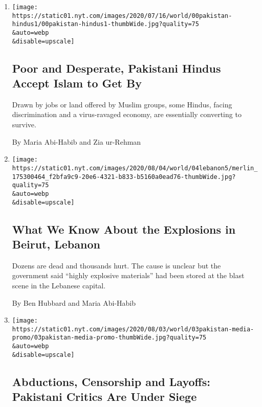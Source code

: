 \begin{enumerate}
\def\labelenumi{\arabic{enumi}.}
\item
  \href{/2020/08/04/world/asia/pakistan-hindu-conversion.html}{}

  \texttt{[image: https://static01.nyt.com/images/2020/07/16/world/00pakistan-hindus1/00pakistan-hindus1-thumbWide.jpg?quality=75\\\&auto=webp\\\&disable=upscale]}

  \hypertarget{poor-and-desperate-pakistani-hindus-accept-islam-to-get-by}{%
  \subsection{Poor and Desperate, Pakistani Hindus Accept Islam to Get
  By}\label{poor-and-desperate-pakistani-hindus-accept-islam-to-get-by}}

  Drawn by jobs or land offered by Muslim groups, some Hindus, facing
  discrimination and a virus-ravaged economy, are essentially converting
  to survive.

  By Maria Abi-Habib and Zia ur-Rehman
\item
  \href{/2020/08/04/world/middleeast/beirut-explosion-blast.html}{}

  \texttt{[image: https://static01.nyt.com/images/2020/08/04/world/04lebanon5/merlin\_175300464\_f2bfa9c9-20e6-4321-b833-b5160a0ead76-thumbWide.jpg?quality=75\\\&auto=webp\\\&disable=upscale]}

  \hypertarget{what-we-know-about-the-explosions-in-beirut-lebanon}{%
  \subsection{What We Know About the Explosions in Beirut,
  Lebanon}\label{what-we-know-about-the-explosions-in-beirut-lebanon}}

  Dozens are dead and thousands hurt. The cause is unclear but the
  government said ``highly explosive materials'' had been stored at the
  blast scene in the Lebanese capital.

  By Ben Hubbard and Maria Abi-Habib
\item
  \href{/2020/08/03/world/asia/pakistan-media-abductions.html}{}

  \texttt{[image: https://static01.nyt.com/images/2020/08/03/world/03pakistan-media-promo/03pakistan-media-promo-thumbWide.jpg?quality=75\\\&auto=webp\\\&disable=upscale]}

  \hypertarget{abductions-censorship-and-layoffs-pakistani-critics-are-under-siege}{%
  \subsection{Abductions, Censorship and Layoffs: Pakistani Critics Are
  Under
  Siege}\label{abductions-censorship-and-layoffs-pakistani-critics-are-under-siege}}


\end{enumerate}
